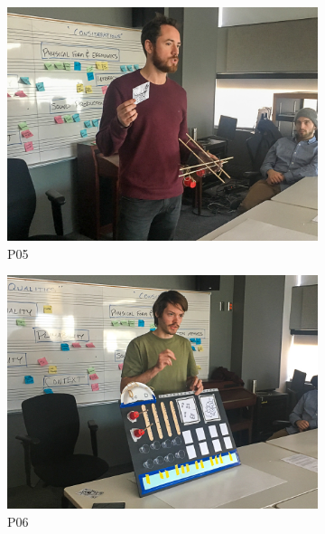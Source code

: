 \documentclass[letterpaper, 12pt]{article}
\begin{document}
\begin{figure}[t]
    \centering
    \begin{subfigure}{0.49\textwidth}
        \centering
        \includegraphics[width=1\textwidth]{CMJ1.jpg}
        \caption{P05}
        \label{ch3-fig:presentations_P05}
    \end{subfigure}
    \begin{subfigure}{0.49\textwidth}
        \centering
        \includegraphics[width=1\textwidth]{CMJ2.jpg}
        \caption{P06}
        \label{ch3-fig:presentations_P06}
    \end{subfigure}
    \begin{subfigure}{0.49\textwidth}
        \centering

\end{subfigure}
\end{figure}
\end{document}
